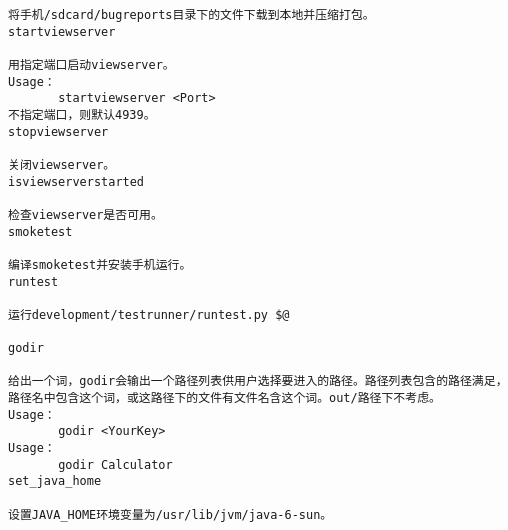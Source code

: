 \documentclass[12pt,a4paper]{article}
\begin{document}
\begin{verbatim}
将手机/sdcard/bugreports目录下的文件下载到本地并压缩打包。
startviewserver
 
用指定端口启动viewserver。
Usage：
       startviewserver <Port>
不指定端口，则默认4939。
stopviewserver
 
关闭viewserver。
isviewserverstarted
 
检查viewserver是否可用。
smoketest
 
编译smoketest并安装手机运行。
runtest
 
运行development/testrunner/runtest.py $@
 
godir
 
给出一个词，godir会输出一个路径列表供用户选择要进入的路径。路径列表包含的路径满足，路径名中包含这个词，或这路径下的文件有文件名含这个词。out/路径下不考虑。
Usage：
       godir <YourKey>
Usage：
       godir Calculator
set_java_home
 
设置JAVA_HOME环境变量为/usr/lib/jvm/java-6-sun。
\end{verbatim}
\label{4_3}
\label{4}
\end{document}
